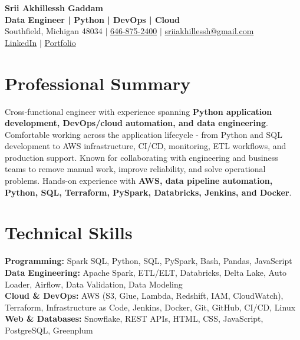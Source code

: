 \documentclass[letterpaper,10pt]{article}
\begin{document}
\fontsize{9.35pt}{10.45pt}\selectfont

\begin{center}
    {\LARGE \textbf{Srii Akhillessh Gaddam}} \\[-1pt]
    \textbf{Data Engineer | Python | DevOps | Cloud} \\[2pt]
    Southfield, Michigan 48034 $|$
    \href{tel:6468752400}{646-875-2400} $|$
    \href{mailto:sriiakhillessh@gmail.com}{sriiakhillessh@gmail.com} \\[1pt]
    \href{https://www.linkedin.com/in/srii-akhiilessh-gaddam-b48668191/}{LinkedIn} $|$
    \href{https://sriiakhillesshg.github.io/portfolio/}{Portfolio}
\end{center}
\vspace{-8pt}

\section{Professional Summary}
\small{Cross-functional engineer with experience spanning \textbf{Python application development, DevOps/cloud automation, and data engineering}. Comfortable working across the application lifecycle - from Python and SQL development to AWS infrastructure, CI/CD, monitoring, ETL workflows, and production support. Known for collaborating with engineering and business teams to remove manual work, improve reliability, and solve operational problems. Hands-on experience with \textbf{AWS, data pipeline automation, Python, SQL, Terraform, PySpark, Databricks, Jenkins, and Docker}.}

\section{Technical Skills}
\small{
\textbf{Programming:} Spark SQL, Python, SQL, PySpark, Bash, Pandas, JavaScript \\
\textbf{Data Engineering:} Apache Spark, ETL/ELT, Databricks, Delta Lake, Auto Loader, Airflow, Data Validation, Data Modeling \\
\textbf{Cloud \& DevOps:} AWS (S3, Glue, Lambda, Redshift, IAM, CloudWatch), Terraform, Infrastructure as Code, Jenkins, Docker, Git, GitHub, CI/CD, Linux \\
\textbf{Web \& Databases:} Snowflake, REST APIs, HTML, CSS, JavaScript, PostgreSQL, Greenplum
}
\end{document}
